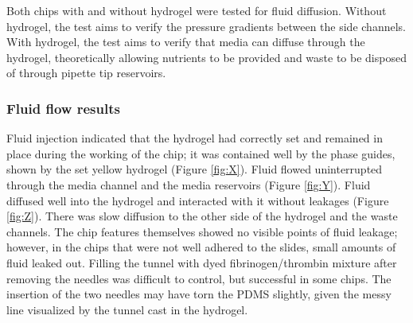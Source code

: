 \documentclass[letterpaper,12pt]{article}
\begin{document}
Both chips with and without hydrogel were tested for fluid diffusion. Without hydrogel, the test aims to verify the pressure gradients between the side channels.  With hydrogel, the test aims to verify that media can diffuse through the hydrogel, theoretically allowing nutrients to be provided and waste to be disposed of through pipette tip reservoirs. 

\subsubsection{Fluid flow results}

Fluid injection indicated that the hydrogel had correctly set and remained in place during the working of the chip; it was contained well by the phase guides, shown by the set yellow hydrogel (Figure \ref{fig:X}). Fluid flowed uninterrupted through the media channel and the media reservoirs (Figure \ref{fig:Y}). Fluid diffused well into the hydrogel and interacted with it without leakages (Figure \ref{fig:Z}). There was slow diffusion to the other side of the hydrogel and the waste channels. The chip features themselves showed no visible points of fluid leakage; however, in the chips that were not well adhered to the slides, small amounts of fluid leaked out. Filling the tunnel with dyed fibrinogen/thrombin mixture after removing the needles was difficult to control, but successful in some chips. The insertion of the two needles may have torn the PDMS slightly, given the messy line visualized by the tunnel cast in the hydrogel. 
\end{document}

